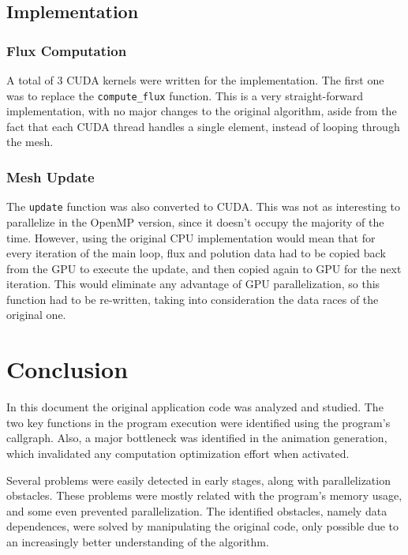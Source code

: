 \documentclass[9pt,twocolumn]{scrartcl}
\newcommand{\paragraphh}[1]{\paragraph{#1\hfill}\hfill

}
\begin{document}
\subsection{Implementation}


\subsubsection{Flux Computation}
A total of 3 CUDA kernels were written for the implementation. The first one was to replace the \texttt{compute\_flux} function. This is a very straight-forward implementation, with no major changes to the original algorithm, aside from the fact that each CUDA thread handles a single element, instead of looping through the mesh.


\subsubsection{Mesh Update}
The \texttt{update} function was also converted to CUDA. This was not as interesting to parallelize in the OpenMP version, since it doesn't occupy the majority of the time. However, using the original CPU implementation would mean that for every iteration of the main loop, flux and polution data had to be copied back from the GPU to execute the update, and then copied again to GPU for the next iteration. This would eliminate any advantage of GPU parallelization, so this function had to be re-written, taking into consideration the data races of the original one.

\section{Conclusion}
In this document the original application code was analyzed and studied. The two key functions in the program execution were identified using the program's callgraph. Also, a major bottleneck was identified in the animation generation, which invalidated any computation optimization effort when activated.

Several problems were easily detected in early stages, along with parallelization obstacles. These problems were mostly related with the program's memory usage, and some even prevented parallelization. The identified obstacles, namely data dependences, were solved by manipulating the original code, only possible due to an increasingly better understanding of the algorithm. 
\end{document}
